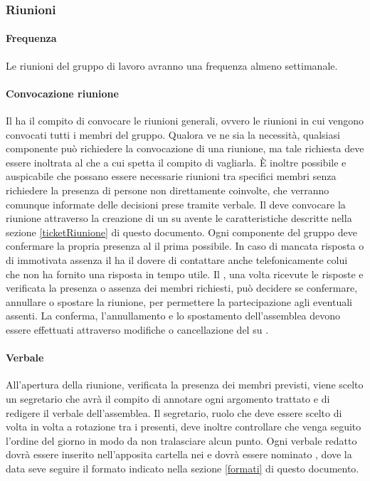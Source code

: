 \documentclass[12pt,a4paper]{article}
\begin{document}
\subsubsection{Riunioni}
\paragraph{Frequenza}
Le riunioni del gruppo di lavoro avranno una frequenza almeno settimanale.

\paragraph{Convocazione riunione}
Il \PM{} ha il compito di convocare le riunioni generali, ovvero le riunioni in cui vengono convocati tutti i membri del gruppo.
Qualora ve ne sia la necessità, qualsiasi componente può richiedere la convocazione di una riunione, ma tale richiesta deve essere inoltrata al \PM{} che a cui spetta il compito di vagliarla. È inoltre possibile e auspicabile che possano essere necessarie riunioni tra specifici membri senza richiedere la presenza di persone non direttamente coinvolte, che verranno comunque informate delle decisioni prese tramite verbale.
Il \PM{} deve convocare la riunione attraverso la creazione di un  su  avente le caratteristiche descritte nella sezione \ref{ticketRiunione} di questo documento.
Ogni componente del gruppo deve confermare la propria presenza al \PM{} il prima possibile. 
In caso di mancata risposta o di immotivata assenza il \PM{} ha il dovere di contattare anche telefonicamente colui che non ha fornito una risposta in tempo utile. Il \PM{}, una volta ricevute le risposte e verificata la presenza o assenza dei membri richiesti, può decidere se confermare, annullare o spostare la riunione, per permettere la partecipazione agli eventuali assenti. La conferma, l'annullamento e lo spostamento dell'assemblea devono essere effettuati attraverso modifiche o cancellazione del  su .

\paragraph{Verbale}
All'apertura della riunione, verificata la presenza dei membri previsti, viene scelto un segretario che avrà il compito di annotare ogni argomento trattato e di redigere il verbale dell'assemblea.
Il segretario, ruolo che deve essere scelto di volta in volta a rotazione tra i presenti, deve inoltre controllare che venga seguito l'ordine del giorno in modo da non tralasciare alcun punto.
Ogni verbale redatto dovrà essere inserito nell'apposita cartella  nei  e dovrà essere nominato , dove la data seve seguire il formato indicato nella sezione \ref{formati} di questo documento.
\end{document}
